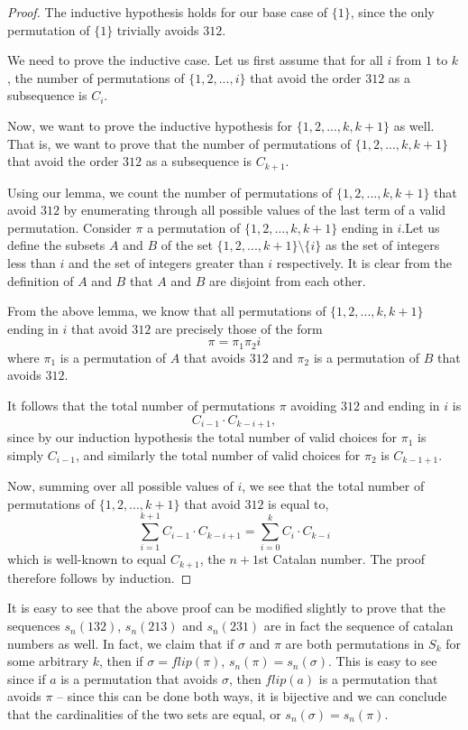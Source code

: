 \documentclass[11pt,letterpaper,twoside,english]{article}
\theoremstyle{theorem}
\theoremstyle{remark}
\begin{document}
\begin{proof}
The inductive hypothesis holds for our base case of $\{1\}$, since the only permutation of $\{1\}$ trivially avoids $312$.

We need to prove the inductive case. Let us first assume that for all $i$ from $1$ to $k$, the number of permutations of $\{1,2,...,i\}$ that avoid the order $312$ as a subsequence is $C_i$.

Now, we want to prove the inductive hypothesis for $\{1,2,...,k,k+1\}$ as well. That is, we want to prove that the number of permutations of $\{1,2,...,k,k+1\}$ that avoid the order $312$ as a subsequence is $C_{k+1}$.

Using our lemma, we count the number of permutations of $\{1,2,...,k,k+1\}$ that avoid $312$ by enumerating through all possible values of the last term of a valid permutation. Consider $\pi$ a permutation of $\{1,2,\ldots, k, k+1\}$ ending in $i$.Let us define the subsets $A$ and $B$ of the  set $\{1,2,...,k+1\} \setminus \{i\}$ as the set of integers less than $i$ and the set of integers greater than $i$ respectively. It is clear from the definition of $A$ and $B$ that $A$ and $B$ are disjoint from each other.

From the above lemma, we know that all permutations of $\{1,2,...,k,k+1\}$ ending in $i$ that avoid $312$ are precisely those of the form
$$\pi = \pi_1 \pi_2 i$$
where $\pi_1$ is a permutation of $A$ that avoids $312$ and $\pi_2$ is a permutation of $B$ that avoids $312$.

It follows that the total number of permutations $\pi$ avoiding $312$ and ending in $i$ is
$$C_{i-1} \cdot C_{k-i+1},$$
since by our induction hypothesis the total number of valid choices for $\pi_1$ is simply $C_{i-1}$, and similarly the total number of valid choices for $\pi_2$ is $C_{k-1+1}$.

Now, summing over all possible values of $i$, we see that the total number of permutations of $\{1,2,...,k+1\}$ that avoid $312$ is equal to,
$$\sum_{i=1}^{k+1} C_{i-1} \cdot C_{k-i+1} = \sum_{i=0}^k C_i \cdot C_{k-i}$$ which is well-known to equal $C_{k+1}$, the $n+1$st Catalan number. The proof  therefore follows by induction.

\end{proof}

It is easy to see that the above proof can be modified slightly to prove that the sequences $s_n(132)$, $s_n(213)$ and $s_n(231)$ are in fact the sequence of catalan numbers as well. In fact, we claim that if $\sigma$ and $\pi$ are both permutations in $S_k$ for some arbitrary $k$, then if $\sigma = flip(\pi)$, $s_n(\pi) = s_n(\sigma)$. This is easy to see since if $a$ is a permutation that avoids $\sigma$, then $flip(a)$ is a permutation that avoids $\pi$ -- since this can be done both ways, it is bijective and we can conclude that the cardinalities of the two sets are equal, or $s_n(\sigma) = s_n(\pi)$.
\end{document}

